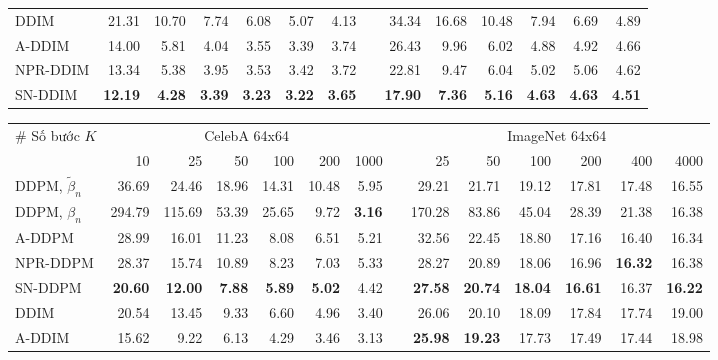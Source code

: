 \documentclass[14pt, a4paper]{article}
\numberwithin{equation}{section}
\numberwithin{figure}{section}
\numberwithin{dl}{section}
\numberwithin{md}{section}
\numberwithin{bd}{section}
\numberwithin{dn}{section}
\numberwithin{hq}{section}
\begin{document}
\begin{table}[h!]
{\begin{tabular}{ lrrrrrrrrrrrrr  }
                \hline
                DDIM & 21.31 & 10.70 & 7.74 & 6.08 & 5.07 & 4.13 & & 34.34 & 16.68 & 10.48 & 7.94 & 6.69 & 4.89 \\
                A-DDIM & 14.00 & 5.81 & 4.04 & 3.55 & 3.39 & 3.74 & & 26.43 & 9.96 & 6.02 & 4.88 & 4.92 & 4.66 \\
                NPR-DDIM & 13.34 & 5.38 & 3.95 & 3.53 & 3.42 & 3.72 & & 22.81 & 9.47 & 6.04 & 5.02 & 5.06 & 4.62 \\
                SN-DDIM & \textbf{12.19} & \textbf{4.28} & \textbf{3.39} & \textbf{3.23} & \textbf{3.22} & \textbf{3.65} & & \textbf{17.90} & \textbf{7.36} & \textbf{5.16} & \textbf{4.63} & \textbf{4.63} & \textbf{4.51} \\
                \hline
            \end{tabular}
        }
        \resizebox{\columnwidth}{!} {
            \begin{tabular}{ lrrrrrrrrrrrrr  }
                \hline
                \multirow{2}{*}{\# Số bước $K$} & \multicolumn{6}{c}{CelebA 64x64} & & \multicolumn{6}{c}{ImageNet 64x64} \\ \cline{2-7} \cline{9-14}
                & 10 & 25 & 50 & 100 & 200 & 1000 & & 25 & 50 & 100 & 200 & 400 & 4000 \\
                \hline
                DDPM, $\tilde{\beta}_n$ & 36.69 & 24.46 & 18.96 & 14.31 & 10.48 & 5.95 & & 29.21 & 21.71 & 19.12 & 17.81 & 17.48 & 16.55 \\
                DDPM, $\beta_n$ & 294.79 & 115.69 & 53.39 & 25.65 & 9.72 & \textbf{3.16} & & 170.28 & 83.86 & 45.04 & 28.39 & 21.38 & 16.38 \\
                A-DDPM & 28.99 & 16.01 & 11.23 & 8.08 & 6.51 & 5.21 & & 32.56 & 22.45 & 18.80 & 17.16 & 16.40 & 16.34 \\
                NPR-DDPM & 28.37 & 15.74 & 10.89 & 8.23 & 7.03 & 5.33 & & 28.27 & 20.89 & 18.06 & 16.96 & \textbf{16.32} & 16.38 \\
                SN-DDPM & \textbf{20.60} & \textbf{12.00} & \textbf{7.88} & \textbf{5.89} & \textbf{5.02} & 4.42 & & \textbf{27.58} & \textbf{20.74} & \textbf{18.04} & \textbf{16.61} & 16.37 & \textbf{16.22} \\
                \hline
                DDIM & 20.54 & 13.45 & 9.33 & 6.60 & 4.96 & 3.40 & & 26.06 & 20.10 & 18.09 & 17.84 & 17.74 & 19.00 \\
                A-DDIM & 15.62 & 9.22 & 6.13 & 4.29 & 3.46 & 3.13 & & \textbf{25.98} & \textbf{19.23} & 17.73 & 17.49 & 17.44 & 18.98 \\

\end{tabular}}
\end{table}
\end{document}
